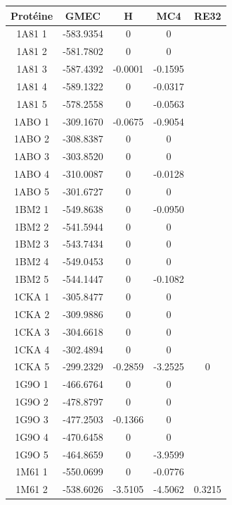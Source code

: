 \documentclass[a4paper,12pt]{book}
\begin{document}
    \begin{table}[h]
      \centering

      \begin{tabular}{|c|c|c|c|c|}


        \hline
        Protéine & GMEC & H & MC4 & RE32 \\
        \hline
        1A81 1 & -583.9354 & 0 & 0 & \\
        1A81 2 & -581.7802 & 0 & 0 & \\
        1A81 3 & -587.4392 & -0.0001 & -0.1595 & \\
        1A81 4 & -589.1322 & 0 & -0.0317 & \\
        1A81 5 & -578.2558 & 0 & -0.0563 & \\
        1ABO 1 & -309.1670 & -0.0675 & -0.9054 & \\
        1ABO 2 & -308.8387 & 0 & 0 & \\
        1ABO 3 & -303.8520 & 0 & 0 & \\
        1ABO 4 & -310.0087 & 0 & -0.0128 & \\
        1ABO 5 & -301.6727 & 0 & 0 & \\
        1BM2 1 & -549.8638 & 0 & -0.0950 & \\
        1BM2 2 & -541.5944 & 0 & 0 & \\
        1BM2 3 & -543.7434 & 0 & 0 & \\
        1BM2 4 & -549.0453 & 0 & 0 & \\
        1BM2 5 & -544.1447 & 0 & -0.1082 & \\
        1CKA 1 & -305.8477 & 0 & 0 & \\
        1CKA 2 & -309.9886 & 0 & 0 & \\
        1CKA 3 & -304.6618 & 0 & 0 & \\
        1CKA 4 & -302.4894 & 0 & 0 & \\
        1CKA 5 & -299.2329 & -0.2859 & -3.2525 & 0 \\
        1G9O 1 & -466.6764 & 0 & 0 & \\
        1G9O 2 & -478.8797 & 0 & 0 & \\
        1G9O 3 & -477.2503 & -0.1366 & 0 & \\
        1G9O 4 & -470.6458 & 0 & 0 & \\
        1G9O 5 & -464.8659 & 0 & -3.9599 & \\
        1M61 1 & -550.0699 & 0 & -0.0776 & \\
        1M61 2 & -538.6026 & -3.5105 & -4.5062 & 0.3215 \\

\end{tabular}
\end{table}
\end{document}
